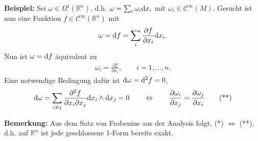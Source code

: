 \documentclass[12pt,a4paper]{article}
\def\R{\mathbb{R}}
\begin{document}
\bigskip

{\bf Beispiel:} Sei $\omega\in\Omega^1(\R^n)$, d.h. $\omega = \sum_{i} \omega_i
\mathrm{d}x_i$ mit $\omega_i\in\mathcal C^\infty(M)$. Gesucht ist nun eine Funktion
$f\in\mathcal C^\infty(\R^n)$ mit
\begin{align*}
\omega = \mathrm{d}f = \sum_{i} \frac{\partial f}{\partial x_i}\mathrm{d}x_i.
\end{align*}
Nun ist $\omega = \mathrm{d}f$ \"aquivalent zu
\begin{align*}
\omega_i = \frac{\partial f}{\partial x_i},\qquad i=1,\ldots,n.\tag{*}
\end{align*}
Eine notwendige Bedingung daf\"ur ist 
$\mathrm{d}\omega = \mathrm{d}^2f = 0$,
\begin{align*}
\mathrm{d}\omega = \sum_{i\neq j}\frac{\partial^2 f}{\partial x_i\partial
x_j}\mathrm{d}x_i\wedge\mathrm{d}x_j = 0\qquad\Leftrightarrow\qquad
\frac{\partial\omega_i}{\partial x_j} =
\frac{\partial \omega_j}{\partial x_i}\tag{**}
\end{align*}

\bigskip

{\bf Bemerkung:} Aus dem Satz von Frobenius aus der Analysis folgt, (*)
$\Leftrightarrow$ (**), d.h. auf $\R^n$ ist jede geschlossene 1-Form bereits
exakt.

\bigskip
\end{document}
